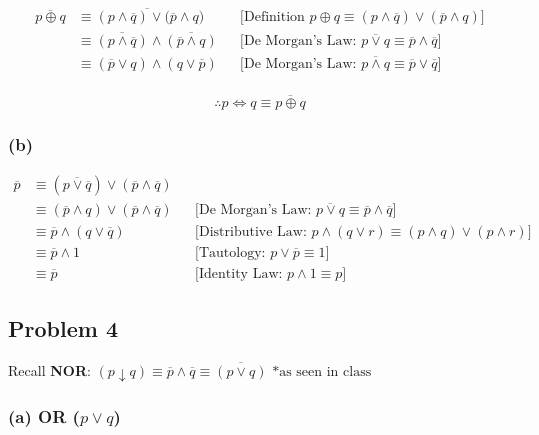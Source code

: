 \documentclass[10pt]{article}
\begin{document}
\begin{align*}
  \overline{p \oplus q} &\equiv \overline{(p \land \overline{q})
  \lor (\overline{p} \land q}) && \text{[Definition } p \oplus q
  \equiv (p \land \overline{q}) \lor (\overline{p} \land q)] \\
    &\equiv \overline{(p \land \overline{q})} \land \overline{(\overline{p}
      \land q)} && \text{[De Morgan's Law: } \overline{p \lor q}
      \equiv \overline{p} \land \overline{q}] \\
    &\equiv (\overline{p} \lor q) \land (q \lor \overline{p})
      && \text{[De Morgan's Law: } \overline{p \land q}
      \equiv \overline{p} \lor \overline{q}] \\
\end{align*}

$$\therefore p \iff q \equiv \overline{p \oplus q}$$

\subsubsection*{(b)}

\begin{align*}
  \overline{p} &\equiv (\overline{p \lor \overline{q}}) \lor (\overline{p}
  \land \overline{q}) \\
    &\equiv (\overline{p} \land q) \lor (\overline{p} \land \overline{q}) &&
      \text{[De Morgan's Law: } \overline{p \lor q} \equiv \overline{p}
      \land \overline{q}] \\
    &\equiv \overline{p} \land (q \lor \overline{q}) && \text{[Distributive Law: }
      p \land (q \lor r) \equiv (p \land q) \lor (p \land r)] \\
    &\equiv \overline{p} \land 1 && \text{[Tautology: } p \lor
      \overline{p} \equiv 1] \\
    &\equiv \overline{p} && \text{[Identity Law: } p \land 1 \equiv p]
\end{align*}

\newpage
\subsection*{Problem 4}

Recall \textbf{NOR}: $(p \downarrow q) \equiv \overline{p} \land \overline{q}
\equiv \overline{(p \lor q)} \text{ *as seen in class}$

\subsubsection*{(a) OR ($p \lor q$)}
\end{document}
